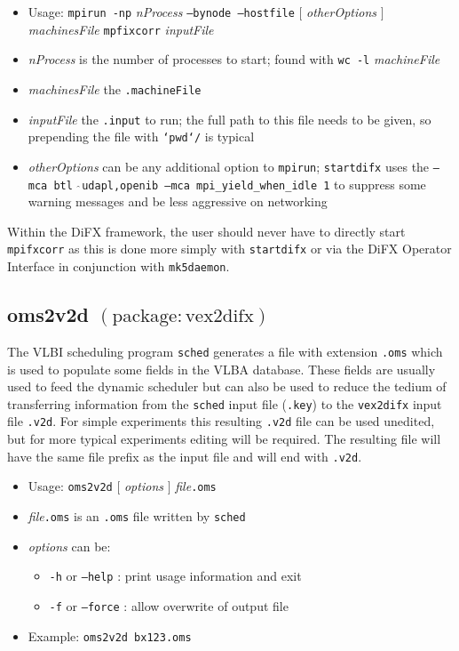 \begin{itemize}
\item[] Usage: {\tt mpirun -np} {\em nProcess} {\tt --bynode --hostfile} $[$ {\em otherOptions} $]$ {\em machinesFile} {\tt mpfixcorr} {\em inputFile}
\item[] {\em nProcess} is the number of processes to start; found with {\tt wc -l} {\em machineFile}
\item[] {\em machinesFile} the {\tt .machineFile}
\item[] {\em inputFile} the {\tt .input} to run; the full path to this file needs to be given, so prepending the file with {\tt `pwd`/} is typical
\item[] {\em otherOptions} can be any additional option to {\tt mpirun}; {\tt startdifx} uses the {\tt --mca btl $\hat{\ }$udapl,openib --mca mpi\_yield\_when\_idle 1} to suppress some warning messages and be less aggressive on networking
\end{itemize}

Within the DiFX framework, the user should never have to directly start {\tt mpifxcorr} as this is done more simply with {\tt startdifx} or via the DiFX Operator Interface in conjunction with {\tt mk5daemon}.









\subsection{oms2v2d {\small $\mathrm{(package: vex2difx)}$} \label{sec:oms2v2d}}

The VLBI scheduling program {\tt sched} generates a file with extension {\tt .oms} which is used to populate some fields in the VLBA database.
These fields are usually used to feed the dynamic scheduler but can also be used to reduce the tedium of transferring information from the {\tt sched} input file ({\tt .key}) to the {\tt vex2difx} input file {\tt .v2d}.
For simple experiments this resulting {\tt .v2d} file can be used unedited, but for more typical experiments editing will be required.
The resulting file will have the same file prefix as the input file and will end with {\tt .v2d}.

\begin{itemize}
\item[] Usage: {\tt oms2v2d} $[$ {\em options} $]$ {\em file}{\tt .oms}

\item[] {\em file}{\tt .oms} is an {\tt .oms} file written by {\tt sched}
\item[] {\em options} can be:
\begin{itemize}
\item[] {\tt -h} or {\tt --help} : print usage information and exit
\item[] {\tt -f} or {\tt --force} : allow overwrite of output file
\end{itemize}
\item[] Example: {\tt oms2v2d bx123.oms}
\end{itemize}

